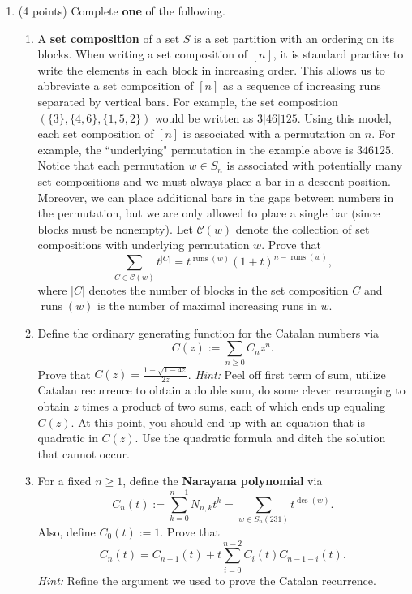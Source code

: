 \documentclass[11pt]{article}
\theoremstyle{definition}
\DeclareMathOperator{\des}{des}
\DeclareMathOperator{\runs}{runs}
\begin{document}
\begin{enumerate}

\item (4 points) Complete \textbf{one} of the following.
\begin{enumerate}
\item A \textbf{set composition} of a set $S$ is a set partition with an ordering on its blocks. When writing a set composition of $[n]$, it is standard practice to write the elements in each block in increasing order. This allows us to abbreviate a set composition of $[n]$ as a sequence of increasing runs separated by vertical bars. For example, the set composition $(\{3\},\{4,6\},\{1,5,2\})$ would be written as $3|46|125$. Using this model, each set composition of $[n]$ is associated with a permutation on $n$. For example, the ``underlying" permutation in the example above is $346125$. Notice that each permutation $w\in S_n$ is associated with potentially many set compositions and we must always place a bar in a descent position. Moreover, we can place additional bars in the gaps between numbers in the permutation, but we are only allowed to place a single bar (since blocks must be nonempty). Let $\mathcal{C}(w)$ denote the collection of set compositions with underlying permutation $w$. Prove that
\[
\sum_{C\in\mathcal{C}(w)}t^{|C|}=t^{\runs(w)}(1+t)^{n-\runs(w)},
\]
where $|C|$ denotes the number of blocks in the set composition $C$ and $\runs(w)$ is the number of maximal increasing runs in $w$.


\item Define the ordinary generating function for the Catalan numbers via
\[
C(z):=\sum_{n\geq 0}C_nz^n.
\]
Prove that $\displaystyle C(z)=\frac{1-\sqrt{1-4z}}{2z}$.  \emph{Hint:} Peel off first term of sum, utilize Catalan recurrence to obtain a double sum, do some clever rearranging to obtain $z$ times a product of two sums, each of which ends up equaling $C(z)$.  At this point, you should end up with an equation that is quadratic in $C(z)$.  Use the quadratic formula and ditch the solution that cannot occur.

\item For a fixed $n\geq 1$, define the \textbf{Narayana polynomial} via
\[
C_n(t):=\sum_{k=0}^{n-1}N_{n,k}t^k=\sum_{w\in S_n(231)}t^{\des(w)}.
\]
Also, define $C_0(t):=1$. Prove that
\[
C_n(t)=C_{n-1}(t)+t\sum_{i=0}^{n-2}C_i(t)C_{n-1-i}(t).
\]
\emph{Hint:} Refine the argument we used to prove the Catalan recurrence.


\end{enumerate}
\end{enumerate}
\end{document}

